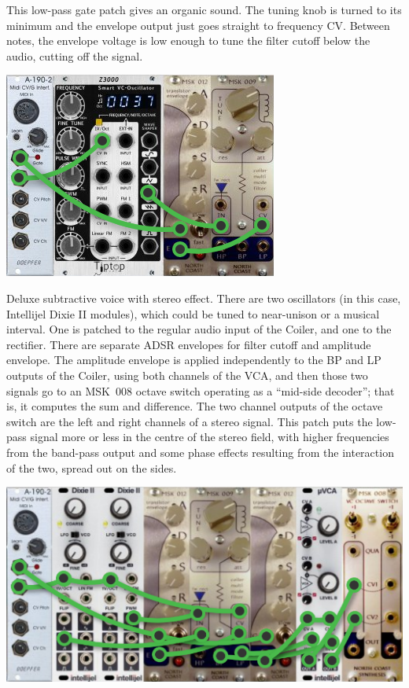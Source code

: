 This low-pass gate patch gives an organic sound.  The
tuning knob is turned to its minimum and the envelope output just goes
straight to frequency CV.  Between notes, the envelope voltage is low enough
to tune the filter cutoff below the audio, cutting off the signal.

\nopagebreak\noindent
{\hspace*{\fill}\includegraphics[scale=1.8]{patch3.png}\hspace*{\fill}\par} 

\pagebreak

Deluxe subtractive voice with stereo effect.  There are two oscillators (in
this case, Intellijel Dixie II modules), which could be tuned to near-unison
or a musical interval.  One is patched to the regular audio input of the
Coiler, and one to the rectifier.  There are separate ADSR envelopes for
filter cutoff and amplitude envelope.  The amplitude envelope is applied
independently to the BP and LP outputs of the Coiler, using both channels of
the VCA, and then those two signals go to an MSK~008 octave switch operating
as a ``mid-side decoder''; that is, it computes the sum and difference.  The
two channel outputs of the octave switch are the left and right channels of
a stereo signal.  This patch puts the low-pass signal more or less in the
centre of the stereo field, with higher frequencies from the band-pass
output and some phase effects resulting from the interaction of the two,
spread out on the sides.

\nopagebreak\noindent
{\hspace*{\fill}\includegraphics[scale=1.8]{patch2.png}\hspace*{\fill}\par} 


